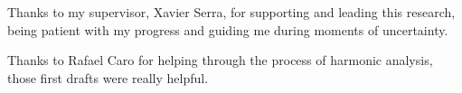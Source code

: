 
\begin{acknowledgement}

Thanks to my supervisor, Xavier Serra, for supporting and leading this research, being patient with my progress and guiding me during moments of uncertainty.

Thanks to Rafael Caro for helping through the process of harmonic analysis, those first drafts were really helpful.

\newpage
\end{acknowledgement}